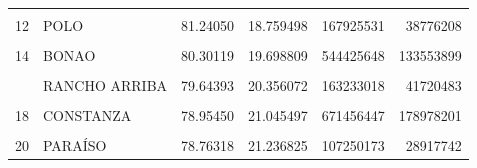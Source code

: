 \documentclass[10pt,landscape,a3paper]{article}
\begin{document}
\begin{table}[H]
\begin{tabular}[t]{llrrrr}
\addlinespace
\cellcolor{lightgray}{11} & \cellcolor{lightgray}{SAMANÁ} & \cellcolor{lightgray}{81.37407} & \cellcolor{lightgray}{18.625933} & \cellcolor{lightgray}{334161130} & \cellcolor{lightgray}{76487058}\\
12 & POLO & 81.24050 & 18.759498 & 167925531 & 38776208\\
\cellcolor{lightgray}{13} & \cellcolor{lightgray}{SÁNCHEZ} & \cellcolor{lightgray}{81.01879} & \cellcolor{lightgray}{18.981205} & \cellcolor{lightgray}{275912749} & \cellcolor{lightgray}{64641255}\\
14 & BONAO & 80.30119 & 19.698809 & 544425648 & 133553899\\
\cellcolor{lightgray}{15} & \cellcolor{lightgray}{CASTILLO} & \cellcolor{lightgray}{80.11398} & \cellcolor{lightgray}{19.886025} & \cellcolor{lightgray}{106634362} & \cellcolor{lightgray}{26468959}\\
\addlinespace
16 & RANCHO ARRIBA & 79.64393 & 20.356072 & 163233018 & 41720483\\
\cellcolor{lightgray}{17} & \cellcolor{lightgray}{PIEDRA BLANCA} & \cellcolor{lightgray}{79.41746} & \cellcolor{lightgray}{20.582538} & \cellcolor{lightgray}{183684957} & \cellcolor{lightgray}{47605432}\\
18 & CONSTANZA & 78.95450 & 21.045497 & 671456447 & 178978201\\
\cellcolor{lightgray}{19} & \cellcolor{lightgray}{VILLA ALTAGRACIA} & \cellcolor{lightgray}{78.83552} & \cellcolor{lightgray}{21.164480} & \cellcolor{lightgray}{336034321} & \cellcolor{lightgray}{90213039}\\
20 & PARAÍSO & 78.76318 & 21.236825 & 107250173 & 28917742\\
\bottomrule
\end{tabular}
\end{table}
\end{document}
